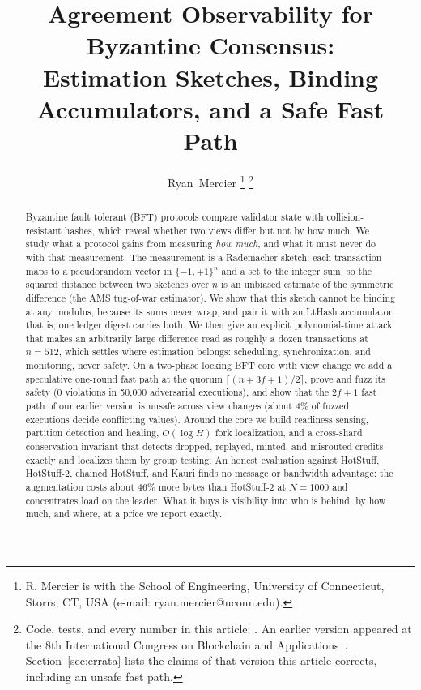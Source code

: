 \documentclass[journal]{IEEEtran}
\begin{document}
\title{Agreement Observability for Byzantine Consensus:\\
Estimation Sketches, Binding Accumulators, and a Safe Fast Path}

\author{Ryan~Mercier%
\thanks{R. Mercier is with the School of Engineering, University of
Connecticut, Storrs, CT, USA (e-mail: ryan.mercier@uconn.edu).}%
\thanks{Code, tests, and every number in this article: \repourl.
An earlier version appeared at the 8th International Congress on
Blockchain and Applications~\cite{mercier2026proxima}. Section~\ref{sec:errata}
lists the claims of that version this article corrects, including an
unsafe fast path.}}


\maketitle

\begin{abstract}
Byzantine fault tolerant (BFT) protocols compare validator state with
collision-resistant hashes, which reveal whether two views differ but not
by how much. We study what a protocol gains from measuring \emph{how much},
and what it must never do with that measurement. The measurement is a
Rademacher sketch: each transaction maps to a pseudorandom vector in
$\{-1,+1\}^{n}$ and a set to the integer sum, so the squared distance
between two sketches over $n$ is an unbiased estimate of the symmetric
difference (the AMS tug-of-war estimator). We show that this sketch
cannot be binding at any modulus, because its sums never wrap, and pair
it with an LtHash accumulator that is; one ledger digest carries both.
We then give an explicit polynomial-time attack that makes an arbitrarily
large difference read as roughly a dozen transactions at $n = 512$, which
settles where estimation belongs: scheduling, synchronization, and
monitoring, never safety. On a two-phase locking BFT core with view
change we add a speculative one-round fast path at the quorum
$\lceil (n + 3f + 1)/2 \rceil$, prove and fuzz its safety (0 violations
in 50,000 adversarial executions), and show that the $2f+1$ fast path of
our earlier version is unsafe across view changes (about 4\% of fuzzed
executions decide conflicting values). Around the core we build readiness
sensing, partition detection and healing, $O(\log H)$ fork localization,
and a cross-shard conservation invariant that detects dropped, replayed,
minted, and misrouted credits exactly and localizes them by group
testing. An honest evaluation against HotStuff, HotStuff-2, chained
HotStuff, and Kauri finds no message or bandwidth advantage: the
augmentation costs about $46\%$ more bytes than HotStuff-2 at
$N = 1000$ and concentrates load on the leader. What it buys is
visibility into who is behind, by how much, and where, at a price we
report exactly.
\end{abstract}
\end{document}
